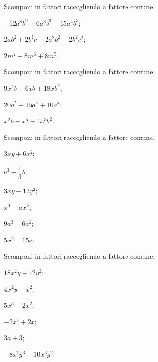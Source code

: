 \begin{esercizio}[\Ast]
\label{ese:15.3}
Scomponi in fattori raccogliendo a fattore comune.
\begin{multicols}{2}
\begin{enumeratea}
 \item $-12a^{8}b^{9}-6a^{3}b^{3}-15a^{4}b^{3}$;
 \item $2ab^{2}+2b^{2}c-2a^{2}b^{2}-2b^{2}c^{2}$;
 \item $2m^{7}+8m^{6}+8m^{5}$.
\end{enumeratea}
\end{multicols}
\end{esercizio}

\begin{esercizio}[\Ast]
\label{ese:15.4}
Scomponi in fattori raccogliendo a fattore comune.
\begin{multicols}{3}
\begin{enumeratea}
 \item $9x^{2}b+6xb+18xb^{2}$;
 \item $20a^{5}+15a^{7}+10a^{4}$;
 \item $x^{2}b-x^{5}-4x^{3}b^{2}$.
\end{enumeratea}
\end{multicols}
\end{esercizio}

\begin{esercizio}
\label{ese:15.5}
Scomponi in fattori raccogliendo a fattore comune.
\begin{multicols}{3}
\begin{enumeratea}
 \item $3xy+6x^{2}$;
 \item $b^{3}+\dfrac{1}{3}b$;
 \item $3xy-12y^{2}$;
 \item $x^{3}-ax^{2}$;
 \item $9a^{3}-6a^{2}$;
 \item $5x^{2}-15x$.
\end{enumeratea}
\end{multicols}
\end{esercizio}

\begin{esercizio}
\label{ese:15.6}
Scomponi in fattori raccogliendo a fattore comune.
\begin{multicols}{3}
\begin{enumeratea}
 \item $18x^{2}y-12y^{2}$;
 \item $4x^{2}y-x^{2}$;
 \item $5x^{3}-2x^{2}$;
 \item $-2x^{3}+2x$;
 \item $3a+3$;
 \item $-8x^{2}y^{3}-10x^{3}y^{2}$.
\end{enumeratea}
\end{multicols}
\end{esercizio}

